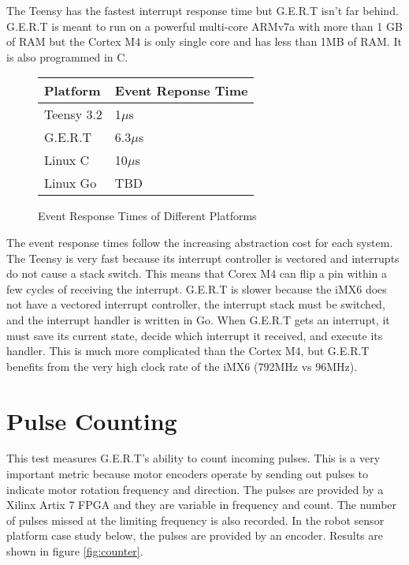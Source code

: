 

The Teensy has the fastest interrupt response time but G.E.R.T isn't far behind.
G.E.R.T is meant to run on a powerful multi-core ARMv7a with more than 1 GB of RAM but the
Cortex M4 is only single core and has less than 1MB of RAM. It is also
programmed in C.

\begin{figure} [h]
\begin{center}
  \begin{tabular}{ | l | l |}
    \hline
    Platform & Event Reponse Time \\ \hline
    Teensy 3.2 & 1$\mu$s \\ \hline
    G.E.R.T & 6.3$\mu$s \\ \hline
    Linux C & 10$\mu$s \\ \hline
    Linux Go & TBD \\
    \hline
  \end{tabular}
\end{center}
  \caption{Event Response Times of Different Platforms}  \label{fig:RT}
\end{figure}

The event response times follow the increasing abstraction cost for each system.
The Teensy is very fast because its interrupt controller is vectored and interrupts
do not cause a stack switch. This means that Corex M4 can flip a pin within a few cycles
of receiving the interrupt. G.E.R.T is slower because the iMX6 does not have a
vectored interrupt controller, the interrupt stack must be switched, and the
interrupt handler is written in Go. When G.E.R.T gets an interrupt, it must save its
current state, decide which interrupt it received, and execute its handler. This is
much more complicated than the Cortex M4, but G.E.R.T benefits from the very high
clock rate of the iMX6 (792MHz vs 96MHz).


\section{Pulse Counting}\label{sec:pulse_count}
This test measures G.E.R.T's ability to count incoming pulses. This is a very
important metric because motor encoders operate by sending out pulses to indicate
motor rotation frequency and direction. The pulses are provided by a Xilinx Artix 7
FPGA and they are variable in frequency and count. The number of pulses missed at
the limiting frequency is also recorded. In the robot sensor platform
case study below, the pulses are provided by an encoder. Results are shown in
figure \ref{fig:counter}. \\

